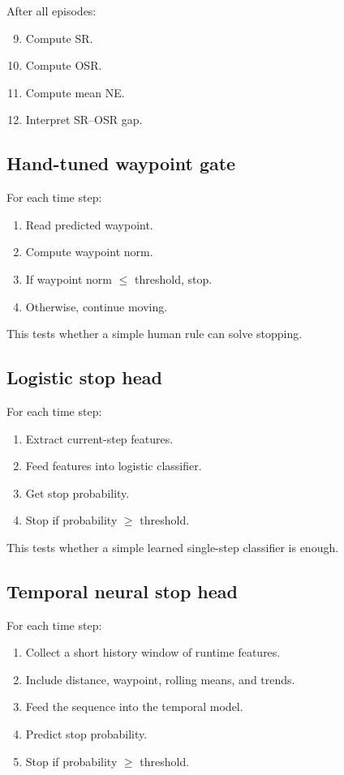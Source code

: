 \documentclass[conference]{IEEEtran}
\begin{document}
After all episodes:
\begin{enumerate}
    \setcounter{enumi}{8}
    \item Compute SR.
    \item Compute OSR.
    \item Compute mean NE.
    \item Interpret SR--OSR gap.
\end{enumerate}

\subsection{Hand-tuned waypoint gate}
For each time step:
\begin{enumerate}
    \item Read predicted waypoint.
    \item Compute waypoint norm.
    \item If waypoint norm $\le$ threshold, stop.
    \item Otherwise, continue moving.
\end{enumerate}

This tests whether a simple human rule can solve stopping.

\subsection{Logistic stop head}
For each time step:
\begin{enumerate}
    \item Extract current-step features.
    \item Feed features into logistic classifier.
    \item Get stop probability.
    \item Stop if probability $\ge$ threshold.
\end{enumerate}

This tests whether a simple learned single-step classifier is enough.

\subsection{Temporal neural stop head}
For each time step:
\begin{enumerate}
    \item Collect a short history window of runtime features.
    \item Include distance, waypoint, rolling means, and trends.
    \item Feed the sequence into the temporal model.
    \item Predict stop probability.
    \item Stop if probability $\ge$ threshold.
\end{enumerate}
\end{document}
